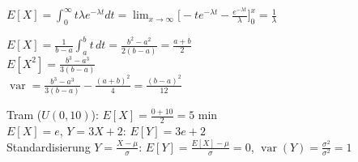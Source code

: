 \begin{bsp}[{{Exponential (4.1.2)}}]
$E[X]=\int_0^\infty t\lambda e^{-\lambda t}dt=\lim_{x\to\infty}\big[-te^{-\lambda t}-\tfrac{e^{-\lambda t}}{\lambda}\big]_0^x=\frac1\lambda$
\end{bsp}
\begin{bsp}[{{Gleichverteilung $[a,b]$ (4.1.8)}}]
$E[X]=\frac1{b-a}\int_a^bt\,dt=\frac{b^2-a^2}{2(b-a)}=\frac{a+b}2$\\
$E[X^2]=\frac{b^3-a^3}{3(b-a)}$\\
$\operatorname{var}=\frac{b^3-a^3}{3(b-a)}-\frac{(a+b)^2}4=\frac{(b-a)^2}{12}$
\end{bsp}
\begin{bsp}
Tram ($U(0,10)$): $E[X]=\frac{0+10}2=5$ min\\
$E[X]=e$, $Y=3X+2$: $E[Y]=3e+2$\\
Standardisierung $Y=\frac{X-\mu}{\sigma}$: $E[Y]=\frac{E[X]-\mu}\sigma=0$, $\operatorname{var}(Y)=\frac{\sigma^2}{\sigma^2}=1$
\end{bsp}
